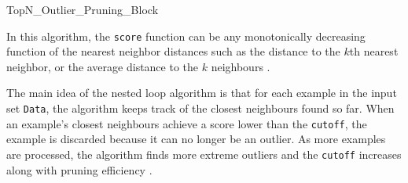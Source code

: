 \begin{algorithm}[t]
\caption{TopN\_Outlier\_Pruning\_Block}
\label{algm:TopNOutlierPruningBlock}

\LinesNumbered





\end{algorithm}

In this algorithm, the \verb+score+ function can be any monotonically decreasing
function of the nearest neighbor distances such as the distance to the $k$th 
nearest neighbor, or the average distance to the $k$ neighbours \cite{Bay:2003}.

The main idea of the  nested loop algorithm is that for each example in the 
input set \verb+Data+, the algorithm keeps track of the closest neighbours found
so far. When an example's closest neighbours achieve a score lower than the 
\verb+cutoff+, the example is discarded because it can no longer be an outlier. 
As more examples are processed, the algorithm finds more extreme outliers and 
the \verb+cutoff+ increases along with pruning efficiency \cite{Bay:2003}.

